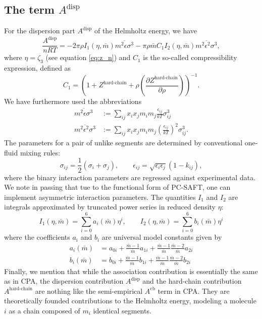 \documentclass[english]{../thermomemo/thermomemo}
\newcommand*{\pder}[2]{\left(\frac{\partial #1}{\partial #2}\right)}
\newcommand{\lp}{\left(}
\newcommand{\rp}{\right)}
\begin{document}
\subsection{The term $A^{\text{disp}}$}
For the dispersion part $A^{\text{disp}}$ of the Helmholtz energy, we have
\begin{equation}
  \frac{A^{\text{disp}}}{nRT} = -2 \pi \rho I_1(\eta,\bar m) \overline{m^2 \epsilon \sigma^3} - \pi \rho \bar m C_1 I_2(\eta,\bar m) \overline{m^2 \epsilon^2 \sigma^3},
\end{equation}
where $\eta = \zeta_3$ (see equation \eqref{eq:z_n}) and $C_1$ is the so-called
compressibility expression, defined as
\begin{equation}
  C_1 = \lp 1+Z^{\text{hard-chain}} + \rho \pder{Z^{\text{hard-chain}}}{\rho} \rp^{-1}.
\end{equation}
We have furthermore used the abbreviations
\begin{align}
  \overline{m^2\epsilon \sigma^3} &:= \sum_{ij} x_i x_j m_i m_j \frac{\epsilon_{ij}}{kT} \sigma_{ij}^3 \\
  \overline{m^2\epsilon^2\sigma^3} &:= \sum_{ij} x_i x_j m_i m_j \lp \frac{\epsilon_{ij}}{kT} \rp^2 \sigma_{ij}^3.
\end{align}
The parameters for a pair of unlike segments are determined by conventional
one-fluid mixing rules:
\begin{equation}
  \sigma_{ij} = \frac{1}{2}(\sigma_i + \sigma_j), \qquad  \epsilon_{ij} = \sqrt{\epsilon_i \epsilon_j} (1-k_{ij}),
\end{equation}
where the binary interaction parameters are regressed against experimental
data. We note in passing that tue to the functional form of PC-SAFT, one can
implement asymmetric interaction parameters. The quantities $I_1$ and $I_2$ are
integrals approximated by truncated power series in reduced density $\eta$:
\begin{equation}
  I_1(\eta,\bar m) = \sum_{i=0}^6 a_i(\bar m) \eta^i, \qquad  I_2(\eta,\bar m) = \sum_{i=0}^6 b_i(\bar m) \eta^i
\end{equation}
where the coefficients $a_i$ and $b_i$ are universal model constants given by
\begin{align}
  a_i(\bar m) &= a_{0i} + \frac{\bar m -1}{\bar m}a_{1i} + \frac{\bar m -1}{\bar m} \frac{\bar m -2}{\bar m}a_{2i} \\
  b_i(\bar m) &= b_{0i} + \frac{\bar m -1}{\bar m}b_{1i} + \frac{\bar m -1}{\bar m} \frac{\bar m -2}{\bar m}b_{2i}
\end{align}
Finally, we mention that while the association contribution is essentially the
same as in CPA, the dispersion contribution $A^{\text{disp}}$ and the hard-chain
contribution $A^{\text{hard-chain}}$ are nothing like the semi-empirical
$A^{\text{cb}}$ term in CPA. They are theoretically founded contributions to the
Helmholtz energy, modeling a molecule $i$ as a chain composed of $m_i$ identical
segments.
\end{document}
